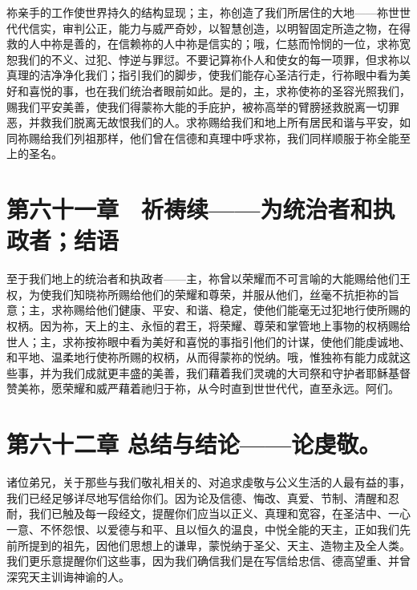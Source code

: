 祢亲手的工作使世界持久的结构显现；主，祢创造了我们所居住的大地——祢世世代代信实，审判公正，能力与威严奇妙，以智慧创造，以明智固定所造之物，在得救的人中祢是善的，在信赖祢的人中祢是信实的；哦，仁慈而怜悯的一位，求祢宽恕我们的不义、过犯、悖逆与罪愆。不要记算祢仆人和使女的每一项罪，但求祢以真理的洁净净化我们；指引我们的脚步，使我们能存心圣洁行走，行祢眼中看为美好和喜悦的事，也在我们统治者眼前如此。是的，主，求祢使祢的圣容光照我们，赐我们平安美善，使我们得蒙祢大能的手庇护，被祢高举的臂膀拯救脱离一切罪恶，并救我们脱离无故恨我们的人。求祢赐给我们和地上所有居民和谐与平安，如同祢赐给我们列祖那样，他们曾在信德和真理中呼求祢，我们同样顺服于祢全能至上的圣名。\par


\section{第六十一章　祈祷续——为统治者和执政者；结语}

至于我们地上的统治者和执政者——主，祢曾以荣耀而不可言喻的大能赐给他们王权，为使我们知晓祢所赐给他们的荣耀和尊荣，并服从他们，丝毫不抗拒祢的旨意；主，求祢赐给他们健康、平安、和谐、稳定，使他们能毫无过犯地行使所赐的权柄。因为祢，天上的主、永恒的君王，将荣耀、尊荣和掌管地上事物的权柄赐给世人；主，求祢按祢眼中看为美好和喜悦的事指引他们的计谋，使他们能虔诚地、和平地、温柔地行使祢所赐的权柄，从而得蒙祢的悦纳。哦，惟独祢有能力成就这些事，并为我们成就更丰盛的美善，我们藉着我们灵魂的大司祭和守护者耶稣基督赞美祢，愿荣耀和威严藉着祂归于祢，从今时直到世世代代，直至永远。阿们。\par


\section{第六十二章  总结与结论——论虔敬。}

诸位弟兄，关于那些与我们敬礼相关的、对追求虔敬与公义生活的人最有益的事，我们已经足够详尽地写信给你们。因为论及信德、悔改、真爱、节制、清醒和忍耐，我们已触及每一段经文，提醒你们应当以正义、真理和宽容，在圣洁中、一心一意、不怀怨恨、以爱德与和平、且以恒久的温良，中悦全能的天主，正如我们先前所提到的祖先，因他们思想上的谦卑，蒙悦纳于圣父、天主、造物主及全人类。我们更乐意提醒你们这些事，因为我们确信我们是在写信给忠信、德高望重、并曾深究天主训诲神谕的人。\par

